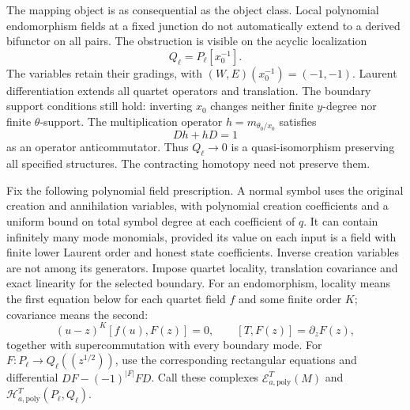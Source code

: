 The mapping object is as consequential as the object class.
Local polynomial endomorphism fields at a fixed junction do
not automatically extend to a derived bifunctor on all pairs.
The obstruction is visible on the acyclic localization
\[
 Q_\ell=P_\ell[x_0^{-1}].
\]
The variables retain their gradings, with
\((W,E)(x_0^{-1})=(-1,-1)\).
Laurent differentiation extends all quartet operators and
translation. The boundary support conditions still hold:
inverting \(x_0\) changes neither finite \(y\)-degree nor
finite \(\theta\)-support. The multiplication operator
\(h=m_{\theta_0/x_0}\) satisfies
\[
 Dh+hD=1
\]
as an operator anticommutator. Thus \(Q_\ell\to0\) is a
quasi-isomorphism preserving all specified structures.
The contracting homotopy need not preserve them.

Fix the following polynomial field prescription. A normal
symbol uses the original creation and annihilation variables,
with polynomial creation coefficients and a uniform bound on
total symbol degree at each coefficient of \(q\). It can
contain infinitely many mode monomials, provided its value
on each input is a field with finite lower Laurent order and
honest state coefficients. Inverse creation variables are
not among its generators. Impose quartet locality,
translation covariance and exact linearity for the selected
boundary. For an endomorphism, locality means the first
equation below for each quartet field \(f\) and some finite
order \(K\); covariance means the second:
\[
 (u-z)^K[f(u),F(z)]=0,\qquad [T,F(z)]=\partial_zF(z),
\]
together with supercommutation with every boundary mode.
For \(F:P_\ell\to Q_\ell((z^{1/2}))\), use the corresponding
rectangular equations and differential
\(DF-(-1)^{|F|}FD\).
Call these complexes \(\mathcal E_{a,\mathrm{poly}}^T(M)\)
and \(\mathcal H_{a,\mathrm{poly}}^T(P_\ell,Q_\ell)\).

